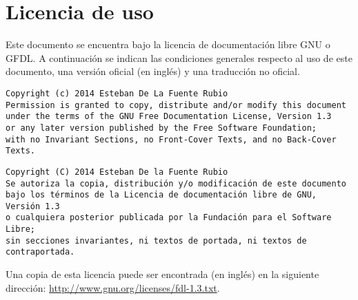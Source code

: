 %
%
%
%  

\chapter*{Licencia de uso}

Este documento se encuentra bajo la licencia de documentación libre GNU o GFDL.
A continuación se indican las condiciones generales respecto al uso de este
documento, una versión oficial (en inglés) y una traducción no oficial.

\begin{verbatim}
Copyright (c) 2014 Esteban De La Fuente Rubio
Permission is granted to copy, distribute and/or modify this document
under the terms of the GNU Free Documentation License, Version 1.3
or any later version published by the Free Software Foundation;
with no Invariant Sections, no Front-Cover Texts, and no Back-Cover Texts.
\end{verbatim}

\begin{verbatim}
Copyright (C) 2014 Esteban De la Fuente Rubio
Se autoriza la copia, distribución y/o modificación de este documento
bajo los términos de la Licencia de documentación libre de GNU, Versión 1.3
o cualquiera posterior publicada por la Fundación para el Software Libre;
sin secciones invariantes, ni textos de portada, ni textos de contraportada.
\end{verbatim}

Una copia de esta licencia puede ser encontrada (en inglés) en la siguiente
dirección: \url{http://www.gnu.org/licenses/fdl-1.3.txt}.

\newpage
\mbox{}
\thispagestyle{empty}
